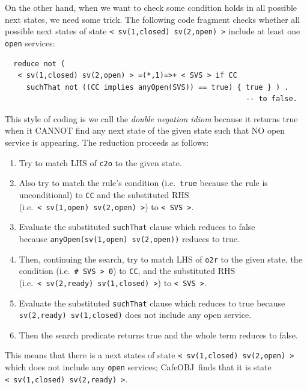 \documentclass[12pt]{report}
\newcommand{\stt}[1]{{\small{\tt {#1}}}}
\newcommand{\cafeobj}{{\sf CafeOBJ}~}
\begin{document}
On the other hand, when we want to check some condition holds in all
possible next states, we need some trick. The following code fragment
checks whether all possible next states of state
\stt{<~sv(1,closed)~sv(2,open)~>} include at least one {\tt open} services:
\small
\begin{verbatim}
  reduce not (
   < sv(1,closed) sv(2,open) > =(*,1)=>+ < SVS > if CC
     suchThat not ((CC implies anyOpen(SVS)) == true) { true } ) .
                                                        -- to false.
\end{verbatim}
\normalsize
This style of coding is we call the {\it double negation idiom}
because it returns true when it CANNOT find any next state of the
given state such that NO open service is appearing. The reduction
proceeds as follows:
\begin{enumerate}
\item Try to match LHS of {\tt c2o} to the given state.
\item Also try to match the rule's condition (i.e.\ {\tt true} because
  the rule is unconditional) to {\tt CC} and the substituted RHS
  (i.e.\ \stt{<~sv(1,open)~sv(2,open)~>}) to \stt{<~SVS~>}.
\item Evaluate the substituted {\tt suchThat} clause which reduces to
  false \\ because \stt{anyOpen(sv(1,open) sv(2,open))} reduces to
  true.
\item Then, continuing the search, try to match LHS of {\tt o2r} to
  the given state, the condition (i.e.\ \stt{\# SVS > 0}) to {\tt CC},
  and the substituted RHS (i.e.\ \stt{<~sv(2,ready)~sv(1,closed)~>}) to
  \stt{<~SVS~>}.
\item Evaluate the substituted {\tt suchThat} clause which reduces to
  true because \stt{sv(2,ready) sv(1,closed)} does not include any
  open service.
\item Then the search predicate returns true and the whole term
  reduces to false.
\end{enumerate}
This means that there is a next states of state
\stt{<~sv(1,closed)~sv(2,open)~>} which does not include any {\tt open}
services; \cafeobj finds that it is state
\stt{<~sv(1,closed)~sv(2,ready)~>}.
\end{document}
